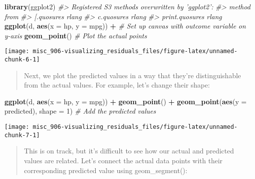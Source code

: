 \documentclass[]{book}
\newenvironment{Shaded}{\begin{snugshade}}{\end{snugshade}}
\newcommand{\CommentTok}[1]{\textcolor[rgb]{0.56,0.35,0.01}{\textit{#1}}}
\newcommand{\DataTypeTok}[1]{\textcolor[rgb]{0.13,0.29,0.53}{#1}}
\newcommand{\DecValTok}[1]{\textcolor[rgb]{0.00,0.00,0.81}{#1}}
\newcommand{\KeywordTok}[1]{\textcolor[rgb]{0.13,0.29,0.53}{\textbf{#1}}}
\newcommand{\NormalTok}[1]{#1}
\newcommand{\OperatorTok}[1]{\textcolor[rgb]{0.81,0.36,0.00}{\textbf{#1}}}
\newcommand{\StringTok}[1]{\textcolor[rgb]{0.31,0.60,0.02}{#1}}
\begin{document}
\begin{Shaded}
\begin{Highlighting}[]
\KeywordTok{library}\NormalTok{(ggplot2)}
\CommentTok{#> Registered S3 methods overwritten by 'ggplot2':}
\CommentTok{#>   method         from }
\CommentTok{#>   [.quosures     rlang}
\CommentTok{#>   c.quosures     rlang}
\CommentTok{#>   print.quosures rlang}
\KeywordTok{ggplot}\NormalTok{(d, }\KeywordTok{aes}\NormalTok{(}\DataTypeTok{x =}\NormalTok{ hp, }\DataTypeTok{y =}\NormalTok{ mpg)) }\OperatorTok{+}\StringTok{  }\CommentTok{# Set up canvas with outcome variable on y-axis}
\StringTok{  }\KeywordTok{geom_point}\NormalTok{()  }\CommentTok{# Plot the actual points}
\end{Highlighting}
\end{Shaded}

\begin{center}\texttt{[image: misc\_906-visualizing\_residuals\_files/figure-latex/unnamed-chunk-6-1]} \end{center}

\begin{quote}
Next, we plot the predicted values in a way that they're distinguishable from the actual values. For example, let's change their shape:
\end{quote}

\begin{Shaded}
\begin{Highlighting}[]
\KeywordTok{ggplot}\NormalTok{(d, }\KeywordTok{aes}\NormalTok{(}\DataTypeTok{x =}\NormalTok{ hp, }\DataTypeTok{y =}\NormalTok{ mpg)) }\OperatorTok{+}
\StringTok{  }\KeywordTok{geom_point}\NormalTok{() }\OperatorTok{+}
\StringTok{  }\KeywordTok{geom_point}\NormalTok{(}\KeywordTok{aes}\NormalTok{(}\DataTypeTok{y =}\NormalTok{ predicted), }\DataTypeTok{shape =} \DecValTok{1}\NormalTok{)  }\CommentTok{# Add the predicted values}
\end{Highlighting}
\end{Shaded}

\begin{center}\texttt{[image: misc\_906-visualizing\_residuals\_files/figure-latex/unnamed-chunk-7-1]} \end{center}

\begin{quote}
This is on track, but it's difficult to see how our actual and predicted values are related. Let's connect the actual data points with their corresponding predicted value using geom\_segment():
\end{quote}
\end{document}
